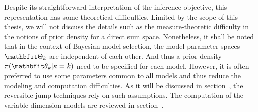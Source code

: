 \documentclass[11pt, hyper, bib, fontset=Minion]{marticle}
\begin{document}
Despite its straightforward interpretation of the inference objective, this
representation has some theoretical difficulties. Limited by the scope of this
thesis, we will not discuss the details such as the measure-theoretic
difficulty in the notions of prior density for a direct sum space.
Nonetheless, it shall be noted that in the context of Bayesian model
selection, the model parameter spaces $\bTh_k$ are independent of each other.
And thus a prior density $\pi(\bth_k|\kappa =k)$ need to be specified for each
model. However, it is often preferred to use some parameters common to all
models and thus reduce the modeling and computation difficulties. As it will
be discussed in section~, the reversible jump
\mcmc techniques rely on such assumptions. The computation of the variable
dimension models are reviewed in section~.

\ifx\inthesis\undefined
\printbibliography
\end{document}
